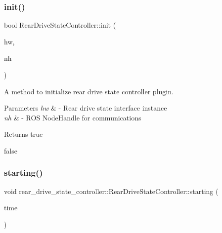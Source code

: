 \subsubsection{\texorpdfstring{init()}{init()}}
{\footnotesize\ttfamily bool Rear\+Drive\+State\+Controller\+::init (\begin{DoxyParamCaption}\item[{\hyperlink{classhardware__interface_1_1RearDriveStateInterface}{hardware\+\_\+interface\+::\+Rear\+Drive\+State\+Interface} $\ast$}]{hw,  }\item[{ros\+::\+Node\+Handle \&}]{nh }\end{DoxyParamCaption})}



A method to initialize rear drive state controller plugin. 


\begin{DoxyParams}{Parameters}
{\em hw} & -\/ Rear drive state interface instance \\
\hline
{\em nh} & -\/ R\+OS Node\+Handle for communications \\
\hline
\end{DoxyParams}
\begin{DoxyReturn}{Returns}
true 

false 
\end{DoxyReturn}
\mbox{\label{classrear__drive__state__controller_1_1RearDriveStateController_a53a87a7512f06f14c71a0bda39a7d37d}} 
\subsubsection{\texorpdfstring{starting()}{starting()}}
{\footnotesize\ttfamily void rear\+\_\+drive\+\_\+state\+\_\+controller\+::\+Rear\+Drive\+State\+Controller\+::starting (\begin{DoxyParamCaption}\item[{const ros\+::\+Time \&}]{time }\end{DoxyParamCaption})\hspace{0.3cm}{\ttfamily [inline]}}



